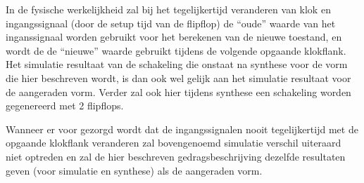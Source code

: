 In de fysische werkelijkheid zal bij het tegelijkertijd 
veranderen van klok en ingangssignaal (door de setup tijd
van de flipflop) de ``oude'' waarde van het 
inganssignaal worden gebruikt voor het berekenen van de 
nieuwe toestand, en wordt de
de ``nieuwe'' waarde gebruikt tijdens de volgende opgaande klokflank.
Het simulatie resultaat van de schakeling die onstaat na synthese
voor de vorm die hier beschreven wordt, is dan ook wel gelijk
aan het simulatie resultaat voor de aangeraden vorm.
Verder zal ook hier tijdens synthese een schakeling worden gegenereerd 
met 2 flipflops.

Wanneer er voor gezorgd wordt dat de ingangssignalen nooit tegelijkertijd
met de opgaande klokflank veranderen zal bovengenoemd
simulatie verschil uiteraard niet optreden en zal de hier beschreven
gedragsbeschrijving dezelfde resultaten geven (voor simulatie en synthese)
als de aangeraden vorm.


